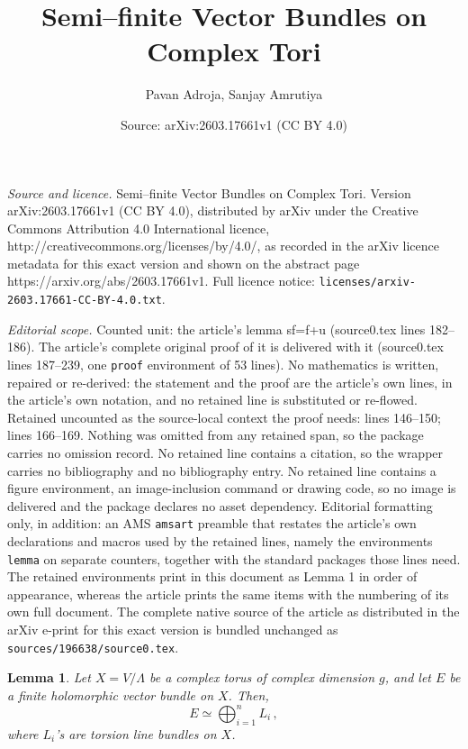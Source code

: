 \documentclass[10pt,a4paper]{amsart}
\title{Semi--finite Vector Bundles on Complex Tori}
\author{Pavan Adroja, Sanjay Amrutiya}
\date{Source: arXiv:2603.17661v1 (CC BY 4.0)}
\newtheorem{lemma}{Lemma}
\begin{document}
\maketitle

\noindent\emph{Source and licence.} Semi--finite Vector Bundles on Complex Tori. Version arXiv:2603.17661v1 (CC BY 4.0), distributed by arXiv under the Creative Commons Attribution 4.0 International licence, http://creativecommons.org/licenses/by/4.0/, as recorded in the arXiv licence metadata for this exact version and shown on the abstract page https://arxiv.org/abs/2603.17661v1. Full licence notice: \texttt{licenses/arxiv-2603.17661-CC-BY-4.0.txt}.\par\smallskip

\noindent\textit{Editorial scope.} Counted unit: the article's lemma sf=f+u (source0.tex lines 182--186). The article's complete original proof of it is delivered with it (source0.tex lines 187--239, one \texttt{proof} environment of 53 lines). No mathematics is written, repaired or re-derived: the statement and the proof are the article's own lines, in the article's own notation, and no retained line is substituted or re-flowed.  Retained uncounted as the source-local context the proof needs: lines 146--150; lines 166--169.  Nothing was omitted from any retained span, so the package carries no omission record.  No retained line contains a citation, so the wrapper carries no bibliography and no bibliography entry.  No retained line contains a figure environment, an image-inclusion command or drawing code, so no image is delivered and the package declares no asset dependency.  Editorial formatting only, in addition: an AMS \texttt{amsart} preamble that restates the article's own declarations and macros used by the retained lines, namely the environments \texttt{lemma} on separate counters, together with the standard packages those lines need.  The retained environments print in this document as Lemma 1 in order of appearance, whereas the article prints the same items with the numbering of its own full document.  The complete native source of the article as distributed in the arXiv e-print for this exact version is bundled unchanged as \texttt{sources/196638/source0.tex}.
\begin{lemma}\label{finite is sum of torsion on torus}
	Let $X=V/\Lambda$ be a complex torus of complex dimension $g$, and let $E$ be a finite holomorphic vector bundle on $X$. Then, 
	$$E\simeq \bigoplus_{i=1}^n L_i\,,$$
	where $L_i$'s are torsion line bundles on $X$.
\end{lemma}
\end{document}
